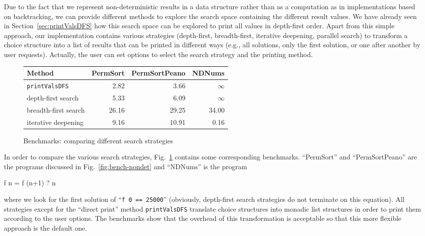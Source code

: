 \documentclass{llncs}
\newcommand{\code}[1]{\mbox{\small\texttt{#1}}}
\newcommand{\ccode}[1]{``\code{#1}''}
\begin{document}
Due to the fact that we represent non-deterministic results
in a data structure rather than as a computation as in implementations
based on backtracking, we can provide different methods to
explore the search space containing the different result values.
We have already seen in Section~\ref{sec:printValsDFS}
how this search space can be explored to print all values in
depth-first order.
Apart from this simple approach,
our implementation contains various strategies
(depth-first, breadth-first, iterative deepening, parallel search)
to transform a choice structure into a list of results
that can be printed in different ways (e.g., all solutions, only the first
solution, or one after another by user requests).
Actually, the user can set options to select the search strategy and
the printing method.

\begin{figure}
\centering
\begin{tabular}{|@{~~}l@{~~}|*{3}{@{~~}r@{~~}|}}
\hline
Method               & PermSort & PermSortPeano &  NDNums \\\hline
\code{printValsDFS}  &    2.82  &         3.66  & $\infty$ \\
depth-first search   &    5.33  &         6.09  & $\infty$ \\
breadth-first search &   26.16  &        29.25  &    34.00 \\
iterative deepening  &    9.16  &        10.91  &     0.16 \\
\hline
\end{tabular}
\caption{Benchmarks: comparing different search strategies}
 \label{fig:search-strategies}
\end{figure}
%
In order to compare the various search strategies,
Fig.~\ref{fig:search-strategies} contains some corresponding
benchmarks.
``PermSort'' and ``PermSortPeano'' are the programs
discussed in Fig.~\ref{fig:bench-nondet} and ``NDNums'' is the program
\begin{curry}
  f n = f (n+1) ? n
\end{curry}
where we look for the first solution of \ccode{f 0 == 25000}
(obviously, depth-first search strategies do not terminate on this
equation).
All strategies except for the ``direct print'' method \code{printValsDFS}
translate choice structures into monadic list structures
in order to print them according to the user options.
The benchmarks show that the overhead of this transformation
is acceptable so that this more flexible approach is the default one.
\end{document}
